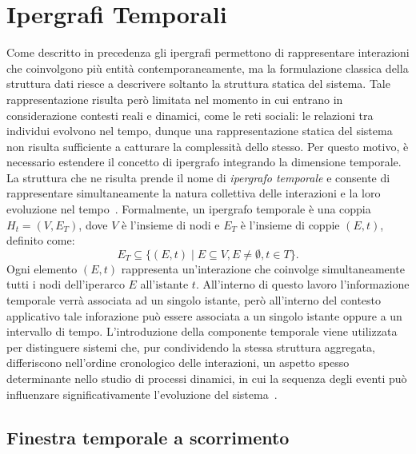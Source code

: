 
\section{Ipergrafi Temporali}\label{sec:ipergrafi_temporali}

Come descritto in precedenza gli ipergrafi permettono di rappresentare interazioni che coinvolgono più entità contemporaneamente, ma la formulazione classica della struttura dati riesce a descrivere soltanto la struttura statica del sistema.
Tale rappresentazione risulta però limitata nel momento in cui entrano in considerazione contesti reali e dinamici, come le reti sociali: le relazioni tra individui evolvono nel tempo, dunque una rappresentazione statica del sistema non risulta sufficiente a catturare la complessità dello stesso. 
Per questo motivo, è necessario estendere il concetto di ipergrafo integrando la dimensione temporale.
La struttura che ne risulta prende il nome di \textit{ipergrafo temporale} e consente di rappresentare simultaneamente la natura collettiva delle interazioni e la loro evoluzione nel tempo~\cite{cencetti2021}.
Formalmente, un ipergrafo temporale è una coppia $H_t = (V, E_T)$, dove $V$ è l'insieme di nodi e $E_T$ è l'insieme di coppie $(E, t)$, definito come: 
\[
    E_T \subseteq \{(E,t) \mid E \subseteq V, E \neq \emptyset, t \in T\}.
\]
Ogni elemento $(E,t)$ rappresenta un'interazione che coinvolge simultaneamente tutti i nodi dell'iperarco $E$ all'istante $t$.
All'interno di questo lavoro l'informazione temporale verrà associata ad un singolo istante, però all'interno del contesto applicativo tale inforazione può essere associata a un singolo istante oppure a un intervallo di tempo.
L'introduzione della componente temporale viene utilizzata per distinguere sistemi che, pur condividendo la stessa struttura aggregata, differiscono nell'ordine cronologico delle interazioni, un aspetto spesso determinante nello studio di processi dinamici, in cui la sequenza degli eventi può influenzare significativamente l'evoluzione del sistema~\cite{holme2012}.

\subsection{Finestra temporale a scorrimento}\label{sec:finestra_temporale}

